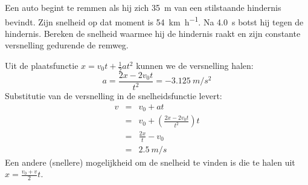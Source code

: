 \documentclass{ximera}
\begin{document}
\begin{exercise}
    Een auto begint te remmen als hij zich \SI{35}{m} van een stilstaande hindernis bevindt. Zijn snelheid op dat moment is \SI{54}{\kilo\meter\per\hour}. Na \SI{4,0}{s} botst hij tegen de hindernis. Bereken de snelheid waarmee hij de hindernis raakt en zijn constante versnelling gedurende de remweg.
    \begin{oplossing}
    Uit de plaatsfunctie $x=v_0t+\frac{1}{2}at^2$ kunnen we de versnelling halen:
    \begin{equation*}
        a=\frac{2x-2v_0t}{t^2}=\SI{-3,125}{m/s^2}
    \end{equation*}
    Substitutie van de versnelling in de snelheidsfunctie levert:
    \begin{eqnarray*}
        v&=&v_0+at\\
        &=&v_0+\left(\frac{2x-2v_0t}{t^2}\right)t\\
        &=&\frac{2x}{t}-v_0\\
        &=&\SI{2,5}{m/s}
    \end{eqnarray*}
    Een andere (snellere) mogelijkheid om de snelheid te vinden is die te halen uit $x=\frac{v_0+v}{2}t$.
    \end{oplossing}
\end{exercise}
\end{document}

